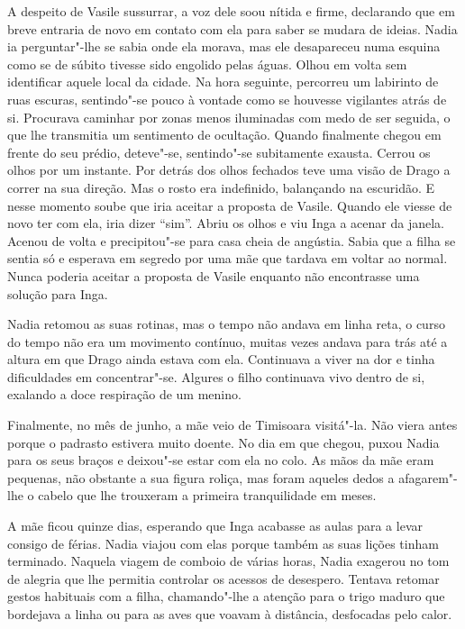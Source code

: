 A despeito de Vasile sussurrar, a voz dele soou nítida e
firme, declarando que em breve entraria de novo em contato com ela
para saber se mudara de ideias. Nadia ia perguntar"-lhe se sabia onde ela
morava, mas ele desapareceu numa esquina como se de súbito tivesse
sido engolido pelas águas. Olhou em volta sem identificar aquele local
da cidade. Na hora seguinte, percorreu um labirinto de ruas escuras,
sentindo"-se pouco à vontade como se houvesse vigilantes atrás de si.
Procurava caminhar por zonas menos iluminadas com medo de ser seguida, o
que lhe transmitia um sentimento de ocultação. Quando finalmente
chegou em frente do seu prédio, deteve"-se, sentindo"-se subitamente exausta. Cerrou os olhos por um instante. Por detrás dos
olhos fechados teve uma visão de Drago a
correr na sua direção. Mas o rosto era indefinido, balançando na
escuridão. E nesse momento soube que iria aceitar a proposta de Vasile.
Quando ele viesse de novo ter com ela, iria dizer ``sim''. Abriu os olhos
e viu Inga a acenar da janela. Acenou de volta e precipitou"-se para
casa cheia de angústia. Sabia que a filha se sentia só e esperava em
segredo por uma mãe que tardava em voltar ao normal. Nunca poderia
aceitar a proposta de Vasile enquanto não encontrasse uma solução para
Inga.

\bigskip

Nadia retomou as suas rotinas, mas o tempo não andava em linha reta, o
curso do tempo não era um movimento contínuo, muitas vezes andava para
trás até a altura em que Drago ainda estava com ela. Continuava a viver
na dor e tinha dificuldades em concentrar"-se. Algures o filho continuava
vivo dentro de si, exalando a doce respiração de um menino.

Finalmente, no mês de junho, a mãe veio de Timisoara visitá"-la. Não
viera antes porque o padrasto estivera muito doente. No dia em que
chegou, puxou Nadia para os seus braços e deixou"-se estar com ela no
colo. As mãos da mãe eram pequenas, não obstante a sua figura roliça,
mas foram aqueles dedos a afagarem"-lhe o cabelo que lhe trouxeram a
primeira tranquilidade em meses.

A mãe ficou quinze dias, esperando que Inga acabasse as aulas para a
levar consigo de férias. Nadia viajou com elas porque também as suas
lições tinham terminado. Naquela viagem de comboio de várias horas,
Nadia exagerou no tom de alegria que lhe permitia controlar os acessos
de desespero. Tentava retomar gestos habituais
com a filha, chamando"-lhe a atenção para o trigo maduro que bordejava a
linha ou para as aves que voavam à distância, desfocadas pelo calor.

